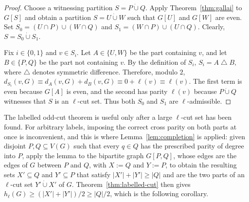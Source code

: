 \documentclass[11pt]{article}
\newcommand{\VV}[1]{{#1}}
\theoremstyle{definition}
\theoremstyle{remark}
\newcommand{\dotcupop}{\mathbin{\dot\cup}}
\newcommand{\1}{\mathbf{1}}
\begin{document}
	\begin{proof}
		Choose a witnessing partition $S=P\dotcupop Q$.  Apply
		Theorem~\ref{thm:gallai} to $G[S]$ and obtain a partition
		$S=U\dotcupop W$ such that $G[U]$ and $G[W]$ are even.  Set
		$S_0=(U\cap P)\cup(W\cap Q)$
		and 
		$ S_1=(W\cap P)\cup(U\cap Q).$
		Clearly, $S=S_0\dotcupop S_1$.
		
		Fix $i\in\{0,1\}$ and $v\in S_i$.  Let $A\in\{U,W\}$ be the part containing
		$v$, and let $B\in\{P,Q\}$ be the part not containing $v$.  By the
		definition of $S_i$,
		$
		S_i=A\mathbin{\triangle}B,
		$
		where $\triangle$ denotes symmetric difference. 
		Therefore, modulo $2$,
		$
		d_{S_i}(v,G)
		\equiv d_A(v,G)+d_B(v,G)
		\equiv 0+\ell(v)
		\equiv \ell(v).
		$
		The first term is even because $G[A]$ is even, and the second has parity
		$\ell(v)$ because $P\dotcupop Q$ witnesses that $S$ is an $\ell$-cut set.
		Thus both $S_0$ and $S_1$ are $\ell$-admissible.  \end{proof}
	
	
	
	The labelled odd-cut theorem is useful only after a large $\ell$-cut set has been found. For arbitrary labels, imposing the correct cross parity on both parts at once is inconvenient, and this is where Lemma~\ref{lem:completion} is applied: given disjoint $P,Q\subseteq V(G)$ such that every $q\in Q$ has the prescribed parity of degree into $P$, apply the lemma to the
    bipartite graph $G[P,Q]$, whose edges are the edges of $G$ between $P$ and $Q$, with $X:=Q$ and $Y:=P$, to obtain the resulting sets $X'\subseteq Q$ and $Y'\subseteq P$ \VV{that} satisfy $|X'|+|Y'|\ge |Q|$ and are the two parts of an $\ell$-cut set $Y'\dotcupop X'$ of $G$.  Theorem~\ref{thm:labelled-cut} then gives $h_\ell(G)\ge (|X'|+|Y'|)/2\ge |Q|/2$, which is the following corollary.
	
\end{document}

